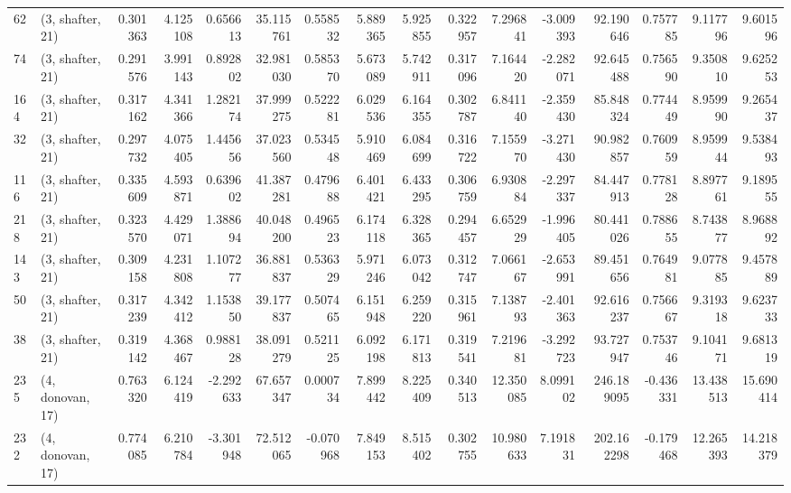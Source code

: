 \begin{tabular}{llrrrrrrrrrrrrrr}
62  &  (3, shafter, 21) &   0.301363 &   4.125108 &  0.656613 &   35.115761 &  0.558532 &   5.889365 &   5.925855 &  0.322957 &   7.296841 &  -3.009393 &   92.190646 &  0.757785 &   9.117796 &   9.601596 \\
74  &  (3, shafter, 21) &   0.291576 &   3.991143 &  0.892802 &   32.981030 &  0.585370 &   5.673089 &   5.742911 &  0.317096 &   7.164420 &  -2.282071 &   92.645488 &  0.756590 &   9.350810 &   9.625253 \\
164 &  (3, shafter, 21) &   0.317162 &   4.341366 &  1.282174 &   37.999275 &  0.522281 &   6.029536 &   6.164355 &  0.302787 &   6.841140 &  -2.359430 &   85.848324 &  0.774449 &   8.959990 &   9.265437 \\
32  &  (3, shafter, 21) &   0.297732 &   4.075405 &  1.445656 &   37.023560 &  0.534548 &   5.910469 &   6.084699 &  0.316722 &   7.155970 &  -3.271430 &   90.982857 &  0.760959 &   8.959944 &   9.538493 \\
116 &  (3, shafter, 21) &   0.335609 &   4.593871 &  0.639602 &   41.387281 &  0.479688 &   6.401421 &   6.433295 &  0.306759 &   6.930884 &  -2.297337 &   84.447913 &  0.778128 &   8.897761 &   9.189555 \\
218 &  (3, shafter, 21) &   0.323570 &   4.429071 &  1.388694 &   40.048200 &  0.496523 &   6.174118 &   6.328365 &  0.294457 &   6.652929 &  -1.996405 &   80.441026 &  0.788655 &   8.743877 &   8.968892 \\
143 &  (3, shafter, 21) &   0.309158 &   4.231808 &  1.107277 &   36.881837 &  0.536329 &   5.971246 &   6.073042 &  0.312747 &   7.066167 &  -2.653991 &   89.451656 &  0.764981 &   9.077885 &   9.457889 \\
50  &  (3, shafter, 21) &   0.317239 &   4.342412 &  1.153850 &   39.177837 &  0.507465 &   6.151948 &   6.259220 &  0.315961 &   7.138793 &  -2.401363 &   92.616237 &  0.756667 &   9.319318 &   9.623733 \\
38  &  (3, shafter, 21) &   0.319142 &   4.368467 &  0.988128 &   38.091279 &  0.521125 &   6.092198 &   6.171813 &  0.319541 &   7.219681 &  -3.292723 &   93.727947 &  0.753746 &   9.104171 &   9.681319 \\
235 &  (4, donovan, 17) &   0.763320 &   6.124419 & -2.292633 &   67.657347 &  0.000734 &   7.899442 &   8.225409 &  0.340513 &  12.350085 &   8.099102 &  246.189095 & -0.436331 &  13.438513 &  15.690414 \\
232 &  (4, donovan, 17) &   0.774085 &   6.210784 & -3.301948 &   72.512065 & -0.070968 &   7.849153 &   8.515402 &  0.302755 &  10.980633 &   7.191831 &  202.162298 & -0.179468 &  12.265393 &  14.218379 \\

\end{tabular}
